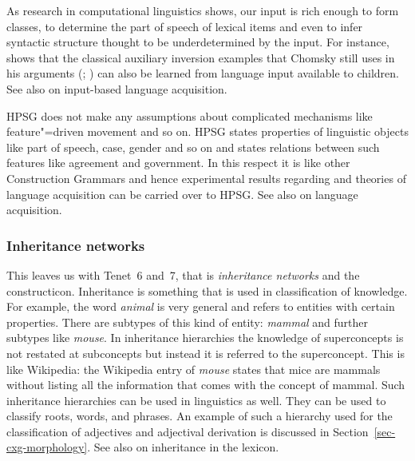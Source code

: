 \documentclass[output=paper]{langsci/langscibook}
\begin{document}
As research in computational linguistics shows, our input is rich
enough to form classes, to determine the part of speech of lexical items and even to infer syntactic
structure thought to be underdetermined by the input. For instance, \citet{Bod2009a} shows that the
classical auxiliary inversion examples that Chomsky still uses in his 
arguments (\citealp[--33]{Chomsky71a-u}; \citealp*{BPYC2011a}) can also be learned from language input available to children. See also
 on input-based language acquisition.

HPSG does not make any assumptions about complicated mechanisms like feature"=driven movement and so
on.
HPSG states properties of linguistic objects like part of speech, case, gender and so on and
states relations between such features like agreement and government. In this respect it is like
other Construction Grammars and hence experimental results regarding and theories of language
acquisition can be carried over to HPSG. See also  on language
acquisition.


\subsubsection{Inheritance networks}
\label{sec-inheritance}

This leaves us with Tenet~6 and~7, that is \emph{inheritance networks} and the
constructicon. Inheritance is something that is used in classification of knowledge. For example,
the word \emph{animal} is very general and refers to entities with certain properties. There are
subtypes of this kind of entity: \emph{mammal} and further subtypes like \emph{mouse}. In inheritance
hierarchies the knowledge of superconcepts is not restated at subconcepts but instead it is referred
to the superconcept. This is like Wikipedia: the Wikipedia entry of \emph{mouse} states that mice
are mammals without listing all the information that comes with the concept of mammal. Such
inheritance hierarchies can be used in linguistics as well. They can be used to classify roots,
words, and phrases. An example of such a hierarchy used for the classification of adjectives and
adjectival derivation is discussed in Section~\ref{sec-cxg-morphology}. See also
 on inheritance in the lexicon.
 
\end{document}
